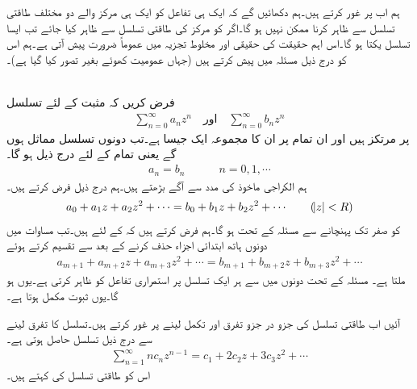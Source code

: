 ہم اب  پر غور کرتے ہیں۔ہم دکھائیں گے کہ ایک ہی تفاعل  کو ایک ہی مرکز والے دو مختلف طاقتی تسلسل سے ظاہر کرنا ممکن نہیں ہو گا۔اگر  کو مرکز  کی طاقتی تسلسل سے ظاہر کیا جائے تب ایسا تسلسل یکتا ہو گا۔اس اہم حقیقت کی حقیقی اور مخلوط تجزیہ میں عموماً ضرورت پیش آتی ہے۔ہم اس کو درج ذیل مسئلہ میں پیش کرتے ہیں (جہاں عمومیت کھوئے بغیر  تصور کیا گیا ہے)۔ 

\quad {}\\
فرض کریں کہ مثبت  کے لئے تسلسل
\begin{align*}
\sum\limits_{n=0}^{\infty} a_n z^n \quad \text{اور}\quad \sum\limits_{n=0}^{\infty} b_n z^n
\end{align*}
 پر مرتکز ہیں اور ان تمام  پر ان کا مجموعہ ایک جیسا ہے۔تب دونوں تسلسل مماثل ہوں گے یعنی تمام  کے لئے درج ذیل ہو گا۔
\begin{align}
a_n=b_n\quad \quad \quad n=0,1,\cdots
\end{align}
\quad
ہم الکراجی ماخوذ کی مدد سے آگے بڑھتے ہیں۔ہم درج ذیل فرض کرتے ہیں۔
\begin{align}\label{مساوات_ٹیلر_مسئلہ_مماثلت_الف}
a_0+a_1z+a_2z^2+\cdots=b_0+b_1z+b_2z^2+\cdots\quad \quad (\abs{z}<R)
\end{align}
 کو صفر تک پہنچانے سے مسئلہ  کے تحت  ہو گا۔ہم فرض کرتے ہیں کہ  کے لئے  ہیں۔تب مساوات  میں دونوں ہاتھ ابتدائی  اجزاء حذف کرنے کے بعد  سے تقسیم کرتے ہوئے
\begin{align*}
a_{m+1}+a_{m+2}z+a_{m+3}z^2+\cdots=b_{m+1}+b_{m+2}z+b_{m+3}z^2+\cdots
\end{align*}
ملتا ہے۔ مسئلہ  کے تحت دونوں میں سے ہر ایک تسلسل  پر استمراری تفاعل کو ظاہر کرتی ہے۔یوں  ہو گا۔یوں ثبوت مکمل ہوتا ہے۔

آئیں اب طاقتی تسلسل کی جزو در جزو تفرق اور تکمل لینے پر غور کرتے ہیں۔تسلسل  کا تفرق لینے سے درج ذیل تسلسل حاصل ہوتی ہے۔
\begin{align}\label{مساوات_ٹیلر_تفرقی_تسلسل}
\sum\limits_{n=1}^{\infty} nc_nz^{n-1}=c_1+2c_2z+3c_3z^2+\cdots
\end{align}
اس کو طاقتی تسلسل کی  کہتے ہیں۔


